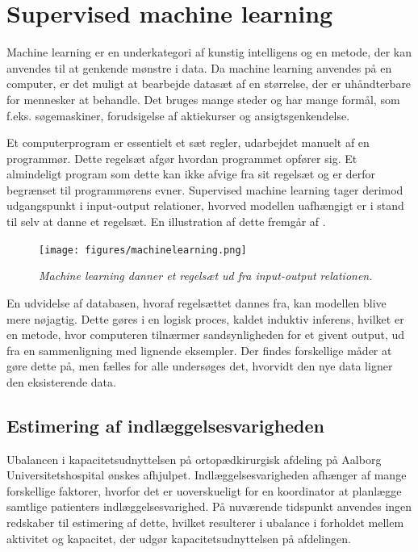 \section{Supervised machine learning}
Machine learning er en underkategori af kunstig intelligens og en metode, der kan anvendes til at genkende mønstre i data. Da machine learning anvendes på en computer, er det muligt at bearbejde datasæt af en størrelse, der er uhåndterbare for mennesker at behandle. Det bruges mange steder og har mange formål, som f.eks. søgemaskiner, forudsigelse af aktiekurser og ansigtsgenkendelse.\cite{DIKU2010}


Et computerprogram er essentielt et sæt regler, udarbejdet manuelt af en programmør. Dette regelsæt afgør hvordan programmet opfører sig. Et almindeligt program som dette kan ikke afvige fra sit regelsæt og er derfor begrænset til programmørens evner.
Supervised machine learning tager derimod udgangspunkt i input-output relationer, hvorved modellen uafhængigt er i stand til selv at danne et regelsæt. En illustration af dette fremgår af .


\begin{figure}[H]
	\centering
	\texttt{[image: figures/machinelearning.png]}
	\caption{\textit{Machine learning danner et regelsæt ud fra input-output relationen.}\cite{DIKU2010}}
	\label{ml}
	\end{figure}


En udvidelse af databasen, hvoraf regelsættet dannes fra, kan modellen blive mere nøjagtig. Dette gøres i en logisk proces, kaldet induktiv inferens, hvilket er en metode, hvor computeren tilnærmer sandsynligheden for et givent output, ud fra en sammenligning med lignende eksempler. Der findes forskellige måder at gøre dette på, men fælles for alle undersøges det, hvorvidt den nye data ligner den eksisterende data.\cite{DIKU2010}


\subsection{Estimering af indlæggelsesvarigheden}
Ubalancen i kapacitetsudnyttelsen på ortopædkirurgisk afdeling på Aalborg Universitetshospital ønskes afhjulpet. Indlæggelsesvarigheden afhænger af mange forskellige faktorer, hvorfor det er uoverskueligt for en koordinator at planlægge samtlige patienters indlæggelsesvarighed. På nuværende tidspunkt anvendes ingen redskaber til estimering af dette, hvilket resulterer i ubalance i forholdet mellem aktivitet og kapacitet, der udgør kapacitetsudnyttelsen på afdelingen. 


